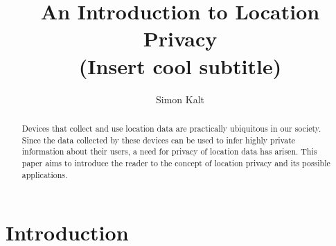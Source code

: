 \documentclass[twocolumn, a4paper, 10pt]{article}
\begin{document}
\title{
    {\Large An Introduction to Location Privacy \\}
    {\large (Insert cool subtitle)}
}

\author{
    Simon Kalt
}

\maketitle

\def\abstractname{Abstract}
\begin{abstract}
{
Devices that collect and use location data are practically ubiquitous in our society. Since the data collected by these devices can be used to infer highly private information about their users, a need for privacy of location data has arisen. This paper aims to introduce the reader to the concept of location privacy and its possible applications.
}
\end{abstract}


\section{Introduction}
\label{sec:introduction}

\lipsum[1-3]


{
    
    
}

\appendix
\end{document}

